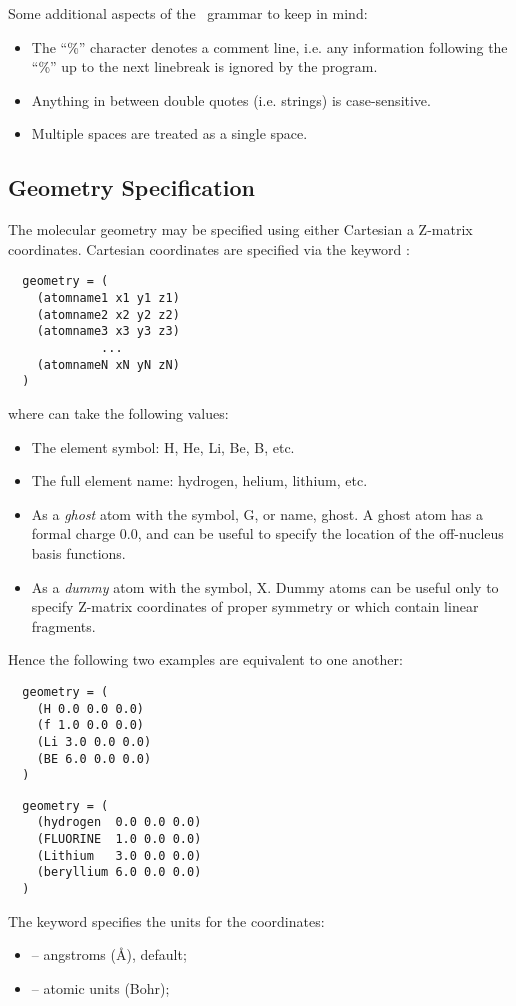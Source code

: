 Some additional aspects of the \PSIthree\ grammar to keep in mind:
\begin{itemize}
\item The ``\%'' character denotes a comment line, i.e. any
  information following the ``\%'' up to the next linebreak is ignored
  by the program.
\item Anything in between double quotes (i.e. strings) is case-sensitive.
\item Multiple spaces are treated as a single space.
\end{itemize}

\subsection{Geometry Specification}
The molecular geometry may be specified using either Cartesian a
Z-matrix coordinates.  Cartesian coordinates are specified via the
keyword :
\begin{verbatim}
  geometry = (
    (atomname1 x1 y1 z1)
    (atomname2 x2 y2 z2)
    (atomname3 x3 y3 z3)
             ...
    (atomnameN xN yN zN)
  )
\end{verbatim}
where  can take the following values:
\begin{itemize}
\item The element symbol: H, He, Li, Be, B, etc.
\item The full element name: hydrogen, helium, lithium, etc.
\item As a {\em ghost} atom with the symbol, G, or name, ghost. A
ghost atom has a formal charge 0.0, and can be useful to specify the
location of the off-nucleus basis functions.
\item As a {\em dummy} atom with the symbol, X.  Dummy atoms can be
useful only to specify Z-matrix coordinates of proper symmetry or
which contain linear fragments.
\end{itemize}
Hence the following two examples are equivalent to one another:
\begin{verbatim}
  geometry = (
    (H 0.0 0.0 0.0)
    (f 1.0 0.0 0.0)
    (Li 3.0 0.0 0.0)
    (BE 6.0 0.0 0.0)
  )
\end{verbatim}
\begin{verbatim}
  geometry = (
    (hydrogen  0.0 0.0 0.0)
    (FLUORINE  1.0 0.0 0.0)
    (Lithium   3.0 0.0 0.0)
    (beryllium 6.0 0.0 0.0)
  )
\end{verbatim}

The keyword  specifies the units for the coordinates:
\begin{itemize}
\item {} -- angstroms (\AA), default;
\item {} -- atomic units (Bohr);
\end{itemize}

